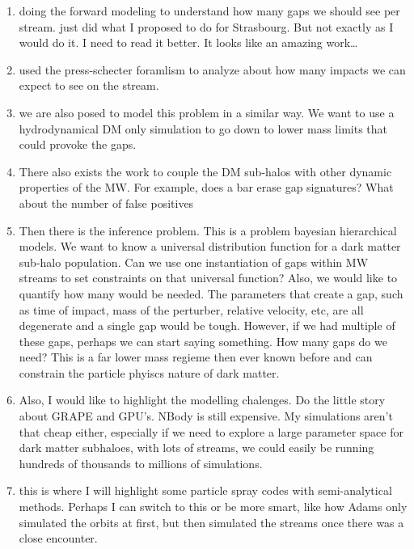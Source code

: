         \begin{enumerate}
            \item doing the forward modeling to understand how many gaps we should see per stream. \citet{2025arXiv250207781L} just did what I proposed to do for Strasbourg. But not exactly as I would do it. I need to read it better. It looks like an amazing work\dots
            \item \citet{2024arXiv241213144A} used the press-schecter foramlism to analyze about how many impacts we can expect to see on the stream. 
            \item we are also posed to model this problem in a similar way. We want to use a hydrodynamical DM only simulation to go down to lower mass limits that could provoke the gaps. 
            \item There also exists the work to couple the DM sub-halos with other dynamic properties of the MW. For example, does a bar erase gap signatures? What about the number of false positives
            \item Then there is the inference problem. This is a problem bayesian hierarchical models. We want to know a universal distribution function for a dark matter sub-halo population. Can we use one instantiation of gaps within MW streams to set constraints on that universal function? Also, we would like to quantify how many would be needed. The parameters that create a gap, such as time of impact, mass of the perturber, relative velocity, etc, are all degenerate and a single gap would be tough. However, if we had multiple of these gaps, perhaps we can start saying something. How many gaps do we need? This is a far lower mass regieme then ever known before and can constrain the particle phyiscs nature of dark matter. 
            \item Also, I would like to highlight the modelling chalenges. Do the little story about GRAPE and GPU's. NBody is still expensive. My simulations aren't that cheap either, especially if we need to explore a large parameter space for dark matter subhaloes, with lots of streams, we could easily be running hundreds of thousands to millions of simulations. 
            \item this is where I will highlight some particle spray codes with semi-analytical methods. Perhaps I can switch to this or be more smart, like how Adams only simulated the orbits at first, but then simulated the streams once there was a close encounter. 
        \end{enumerate}


